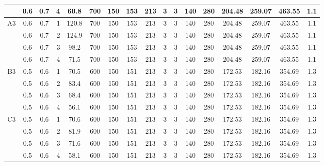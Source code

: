 \begin{table}[H]
{\begin{tabular}{|c|c|c|r|c|c|c|c|c|c|c|c|c|c|c|c|c|}
\cline{2-17}          & 0.6   & 0.7   & 4     & 60.8  & 700   & 150   & 153   & 213   & 3     & 3     & 140   & 280   & 204.48 & 259.07 & 463.55 & 1.1 \bigstrut\\
    \hline
    \multirow{4}[8]{*}{A3} & 0.6   & 0.7   & 1     & 120.8 & 700   & 150   & 153   & 213   & 3     & 3     & 140   & 280   & 204.48 & 259.07 & 463.55 & 1.1 \bigstrut\\
\cline{2-17}          & 0.6   & 0.7   & 2     & 124.9 & 700   & 150   & 153   & 213   & 3     & 3     & 140   & 280   & 204.48 & 259.07 & 463.55 & 1.1 \bigstrut\\
\cline{2-17}          & 0.6   & 0.7   & 3     & 98.2  & 700   & 150   & 153   & 213   & 3     & 3     & 140   & 280   & 204.48 & 259.07 & 463.55 & 1.1 \bigstrut\\
\cline{2-17}          & 0.6   & 0.7   & 4     & 71.5  & 700   & 150   & 153   & 213   & 3     & 3     & 140   & 280   & 204.48 & 259.07 & 463.55 & 1.1 \bigstrut\\
    \hline
    \multirow{4}[8]{*}{B3} & 0.5   & 0.6   & 1     & 70.5  & 600   & 150   & 151   & 213   & 3     & 3     & 140   & 280   & 172.53 & 182.16 & 354.69 & 1.3 \bigstrut\\
\cline{2-17}          & 0.5   & 0.6   & 2     & 83.4  & 600   & 150   & 151   & 213   & 3     & 3     & 140   & 280   & 172.53 & 182.16 & 354.69 & 1.3 \bigstrut\\
\cline{2-17}          & 0.5   & 0.6   & 3     & 68.4  & 600   & 150   & 151   & 213   & 3     & 3     & 140   & 280   & 172.53 & 182.16 & 354.69 & 1.3 \bigstrut\\
\cline{2-17}          & 0.5   & 0.6   & 4     & 56.1  & 600   & 150   & 151   & 213   & 3     & 3     & 140   & 280   & 172.53 & 182.16 & 354.69 & 1.3 \bigstrut\\
    \hline
    \multirow{4}[8]{*}{C3} & 0.5   & 0.6   & 1     & 70.6  & 600   & 150   & 151   & 213   & 3     & 3     & 140   & 280   & 172.53 & 182.16 & 354.69 & 1.3 \bigstrut\\
\cline{2-17}          & 0.5   & 0.6   & 2     & 81.9  & 600   & 150   & 151   & 213   & 3     & 3     & 140   & 280   & 172.53 & 182.16 & 354.69 & 1.3 \bigstrut\\
\cline{2-17}          & 0.5   & 0.6   & 3     & 71.6  & 600   & 150   & 151   & 213   & 3     & 3     & 140   & 280   & 172.53 & 182.16 & 354.69 & 1.3 \bigstrut\\
\cline{2-17}          & 0.5   & 0.6   & 4     & 58.1  & 600   & 150   & 151   & 213   & 3     & 3     & 140   & 280   & 172.53 & 182.16 & 354.69 & 1.3 \bigstrut\\

\end{tabular}}
\end{table}
